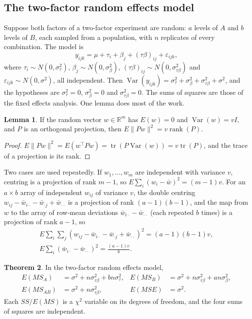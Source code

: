 \documentclass[11pt,a4paper]{article}
\numberwithin{equation}{section}
\DeclareMathOperator{\Var}{Var}
\theoremstyle{definition}
\newtheorem{thm}{Theorem}[subsection]
\newtheorem{lem}[thm]{Lemma}
\begin{document}
\subsection{The two-factor random effects model}
Suppose both factors of a two-factor experiment are random: $a$ levels of $A$ and $b$ levels of $B$, each sampled from a population, with $n$ replicates of every
combination. The model is
\[
y_{ijk} = \mu + \tau_i + \beta_j + (\tau\beta)_{ij} + \varepsilon_{ijk} ,
\]
where $\tau_i \sim N(0, \sigma^2_\tau)$, $\beta_j \sim N(0, \sigma^2_\beta)$, $(\tau\beta)_{ij} \sim N(0, \sigma^2_{\tau\beta})$ and $\varepsilon_{ijk} \sim N(0, \sigma^2)$, all independent. Then $\Var(y_{ijk}) = \sigma^2_\tau + \sigma^2_\beta + \sigma^2_{\tau\beta} + \sigma^2$, and the
hypotheses are $\sigma^2_\tau = 0$, $\sigma^2_\beta = 0$ and $\sigma^2_{\tau\beta} = 0$. The sums of squares are those of the fixed effects analysis. One lemma does most of the work.

\begin{lem}\label{lem:projection}
If the random vector $w \in \mathbb R^m$ has $E(w) = 0$ and $\Var(w) = vI$, and $P$ is an orthogonal projection, then $E\|Pw\|^2 = v\operatorname{rank}(P)$.
\end{lem}

\begin{proof}
$E\|Pw\|^2 = E(w^\top Pw) = \operatorname{tr}(P\Var(w)) = v\operatorname{tr}(P)$, and the trace of a projection is its rank.
\end{proof}

Two cases are used repeatedly. If $w_1, \dots, w_m$ are independent with variance $v$, centring is a projection of rank $m - 1$, so $E\sum_i(w_i - \bar w)^2 = (m - 1)v$. For an $a \times b$
array of independent $w_{ij}$ of variance $v$, the double centring $w_{ij} - \bar w_{i\cdot} - \bar w_{\cdot j} + \bar w_{\cdot\cdot}$ is a projection of rank $(a - 1)(b - 1)$, and the map from $w$ to the
array of row-mean deviations $\bar w_{i\cdot} - \bar w_{\cdot\cdot}$ (each repeated $b$ times) is a projection of rank $a - 1$, so
\begin{gather*}
E\sum_i\sum_j(w_{ij} - \bar w_{i\cdot} - \bar w_{\cdot j} + \bar w_{\cdot\cdot})^2 = (a - 1)(b - 1)v , \\
E\sum_i(\bar w_{i\cdot} - \bar w_{\cdot\cdot})^2 = \frac{(a - 1)v}b .
\end{gather*}

\begin{thm}\label{thm:twoway-random}
In the two-factor random effects model,
\begin{align*}
E(MS_A) &= \sigma^2 + n\sigma^2_{\tau\beta} + bn\sigma^2_\tau , & E(MS_B) &= \sigma^2 + n\sigma^2_{\tau\beta} + an\sigma^2_\beta , \\
E(MS_{AB}) &= \sigma^2 + n\sigma^2_{\tau\beta} , & E(MSE) &= \sigma^2 .
\end{align*}
Each $SS/E(MS)$ is a $\chi^2$ variable on its degrees of freedom, and the four sums of squares are independent.
\end{thm}
\end{document}
